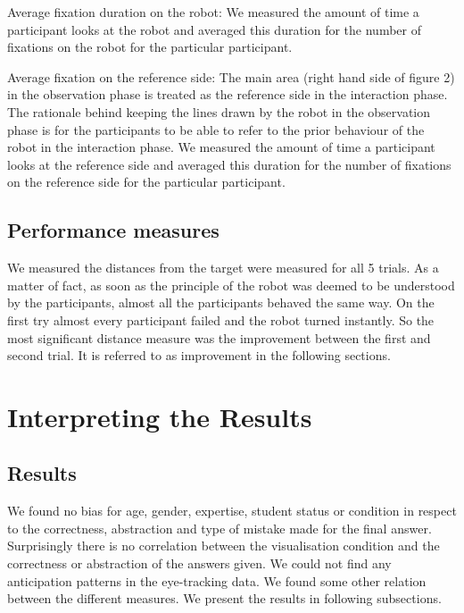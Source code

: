 \documentclass{sig-alternate}
\begin{document}
Average fixation duration on the robot: We measured the amount of time a
participant looks at the robot and averaged this duration for the number
of fixations on the robot for the particular participant.

Average fixation on the reference side: The main area (right hand side
of figure 2) in the observation phase is treated as the reference side
in the interaction phase. The rationale behind keeping the lines drawn
by the robot in the observation phase is for the participants to be able
to refer to the prior behaviour of the robot in the interaction phase. We
measured the amount of time a participant looks at the reference side
and averaged this duration for the number of fixations on the reference
side for the particular participant.

\subsection{Performance measures}


We measured the distances from the target were measured for all 5 trials. As
a matter of fact, as soon as the principle of the robot was deemed to be
understood by the participants, almost all the participants behaved the
same way. On the first try almost every participant failed and the robot
turned instantly. So the most significant distance measure was the
improvement between the first and second trial. It is referred to as
improvement in the following sections.




\section{Interpreting the Results}
\label{interpretation}

\subsection{Results}

We found no bias for age, gender, expertise, student status or condition
in respect to the correctness, abstraction and type of mistake made for
the final answer. Surprisingly there is no correlation between the
visualisation condition and the correctness or abstraction of the
answers given. We could not find any anticipation patterns in the
eye-tracking data. We found some other relation between the different
measures. We present the results in following subsections.
\end{document}
